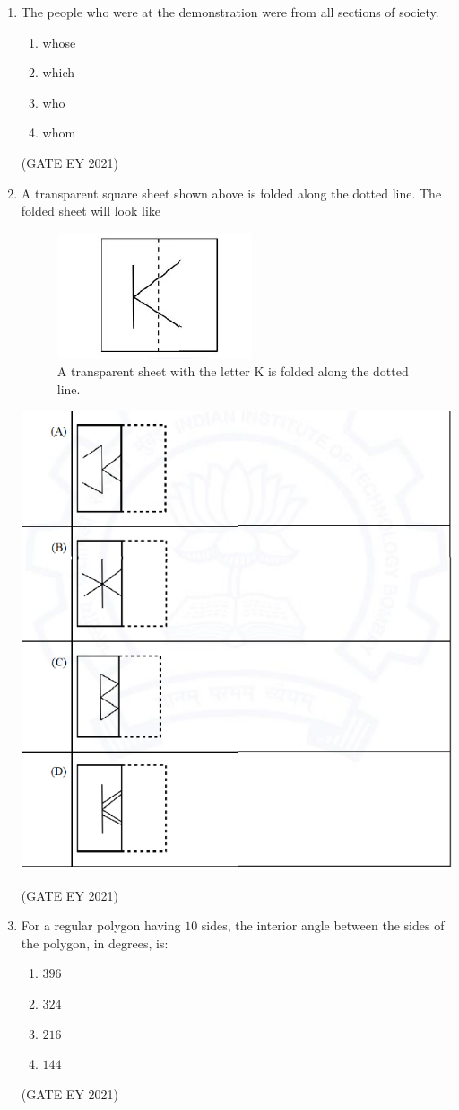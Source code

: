 \documentclass[journal]{IEEEtran}
\begin{document}
\begin{enumerate}
    \item The people \underline{\hspace{2cm}} who were at the demonstration were from all sections of society.
    \begin{multicols}{2}
    \begin{enumerate}
        \item whose
        \item which
        \item who
        \item whom
    \end{enumerate}
    \end{multicols}
    \hfill{(GATE EY 2021)}

    \item A transparent square sheet shown above is folded along the dotted line. The folded sheet will look like
    \begin{figure}[!h]
        \centering
        \includegraphics[width=0.4\columnwidth]{figs/Q.2.png}
        \caption{A transparent sheet with the letter K is folded along the dotted line.}
    \end{figure}
    \begin{multicols}{2}
        \includegraphics[width=0.5\columnwidth]{figs/Q.2-A.png}
    \end{multicols}
    \hfill{(GATE EY 2021)}

    \item For a regular polygon having $10$ sides, the interior angle between the sides of the polygon, in degrees, is:
    \begin{multicols}{2}
    \begin{enumerate}
        \item $396$
        \item $324$
        \item $216$
        \item $144$
    \end{enumerate}
    \end{multicols}
    \hfill{(GATE EY 2021)}


\end{enumerate}
\end{document}
